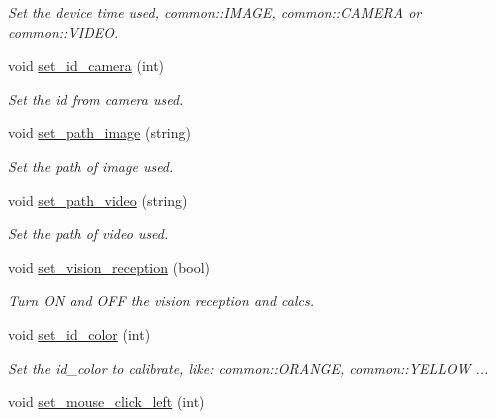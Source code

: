 \begin{DoxyCompactItemize}
\begin{DoxyCompactList}\small\item\em Set the device time used, common\-::\-I\-M\-A\-G\-E, common\-::\-C\-A\-M\-E\-R\-A or common\-::\-V\-I\-D\-E\-O. \end{DoxyCompactList}\item 
\hypertarget{classcalibration_aee45977e438474eb1111964a827a8ff9}{void \hyperlink{classcalibration_aee45977e438474eb1111964a827a8ff9}{set\-\_\-id\-\_\-camera} (int)}\label{classcalibration_aee45977e438474eb1111964a827a8ff9}

\begin{DoxyCompactList}\small\item\em Set the id from camera used. \end{DoxyCompactList}\item 
\hypertarget{classcalibration_a2eacc8d2c839f71182d3ec0440056ee7}{void \hyperlink{classcalibration_a2eacc8d2c839f71182d3ec0440056ee7}{set\-\_\-path\-\_\-image} (string)}\label{classcalibration_a2eacc8d2c839f71182d3ec0440056ee7}

\begin{DoxyCompactList}\small\item\em Set the path of image used. \end{DoxyCompactList}\item 
\hypertarget{classcalibration_ac4b64b95163be3bfdfb13c2d23592756}{void \hyperlink{classcalibration_ac4b64b95163be3bfdfb13c2d23592756}{set\-\_\-path\-\_\-video} (string)}\label{classcalibration_ac4b64b95163be3bfdfb13c2d23592756}

\begin{DoxyCompactList}\small\item\em Set the path of video used. \end{DoxyCompactList}\item 
void \hyperlink{classcalibration_a5a1d0ee04511fc9a61767d3bb3f4e357}{set\-\_\-vision\-\_\-reception} (bool)
\begin{DoxyCompactList}\small\item\em Turn O\-N and O\-F\-F the vision reception and calcs. \end{DoxyCompactList}\item 
\hypertarget{classcalibration_a6e2c50598a4f5d49c6d7bda23b69ddf3}{void \hyperlink{classcalibration_a6e2c50598a4f5d49c6d7bda23b69ddf3}{set\-\_\-id\-\_\-color} (int)}\label{classcalibration_a6e2c50598a4f5d49c6d7bda23b69ddf3}

\begin{DoxyCompactList}\small\item\em Set the id\-\_\-color to calibrate, like\-: common\-::\-O\-R\-A\-N\-G\-E, common\-::\-Y\-E\-L\-L\-O\-W ... \end{DoxyCompactList}\item 
\hypertarget{classcalibration_aaaf40baef708cb370c468ea0799ffaf6}{void \hyperlink{classcalibration_aaaf40baef708cb370c468ea0799ffaf6}{set\-\_\-mouse\-\_\-click\-\_\-left} (int)}\label{classcalibration_aaaf40baef708cb370c468ea0799ffaf6}


\end{DoxyCompactItemize}
